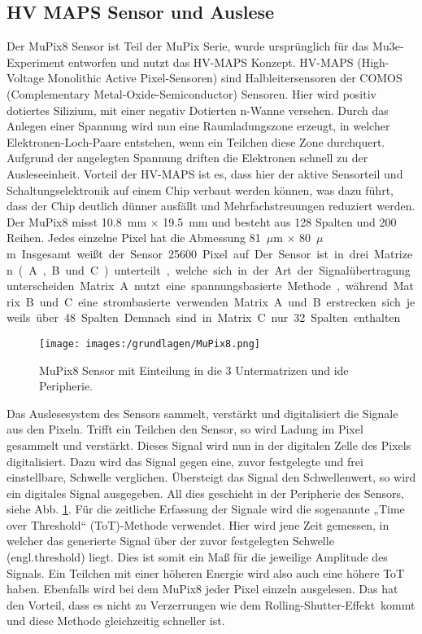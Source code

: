 \subsection{HV MAPS Sensor und Auslese}

Der MuPix8 Sensor ist Teil der MuPix Serie, wurde ursprünglich für das Mu3e-Experiment entworfen und nutzt das HV-MAPS Konzept.
HV-MAPS (High-Voltage Monolithic Active Pixel-Sensoren) sind Halbleitersensoren der COMOS (Complementary Metal-Oxide-Semiconductor) Sensoren. 
Hier wird positiv dotiertes Silizium, mit einer negativ Dotierten n-Wanne versehen. 
Durch das Anlegen einer Spannung wird nun eine Raumladungszone erzeugt, in welcher Elektronen-Loch-Paare entstehen, wenn ein Teilchen diese Zone durchquert.
Aufgrund der angelegten Spannung driften die Elektronen schnell zu der Ausleseeinheit. 
Vorteil der HV-MAPS ist es, dass hier der aktive Sensorteil und Schaltungselektronik auf einem Chip verbaut werden können, was dazu führt, dass der Chip deutlich dünner ausfällt und Mehrfachstreuungen reduziert werden. \\
\newline
Der MuPix8 misst \SI{10,8}{mm} $\times$ \SI{19,5}{mm} und besteht aus 128 Spalten und 200 Reihen. 
Jedes einzelne Pixel hat die Abmessung \SI{81}{$\mu$m} $\times$ \SI{80}{$\mu$m}.
Insgesamt weißt der Sensor 25600 Pixel auf.
Der Sensor ist in  drei Matrizen (A,B und C) unterteilt, welche sich in der Art der Signalübertragung unterscheiden. 
Matrix A nutzt eine spannungsbasierte Methode, während Matrix B und C eine strombasierte verwenden. 
Matrix A und B erstrecken sich jeweils über 48 Spalten.
Demnach sind in Matrix C nur 32 Spalten enthalten. \\

\begin{figure}[H]
    \centering
    \texttt{[image: images:/grundlagen/MuPix8.png]}
    \caption{ MuPix8 Sensor mit Einteilung in die 3 Untermatrizen und ide Peripherie.  \cite{Augustin2019}}
    \label{fig:MuPix}
\end{figure}

Das Auslesesystem des Sensors sammelt, verstärkt und digitalisiert die Signale aus den Pixeln. 
Trifft ein Teilchen den Sensor, so wird Ladung im Pixel gesammelt und verstärkt. 
Dieses Signal wird nun in der digitalen Zelle des Pixels digitalisiert.
Dazu wird das Signal gegen eine, zuvor festgelegte und frei einstellbare, Schwelle verglichen. 
Übersteigt das Signal den Schwellenwert, so wird ein digitales Signal ausgegeben. 
All dies geschieht in der Peripherie des Sensors, siehe Abb. \ref{fig:MuPix}.
Für die zeitliche Erfassung der Signale wird die sogenannte  „Time over Threshold“ (ToT)-Methode verwendet.
Hier wird jene Zeit gemessen, in welcher das generierte Signal über der zuvor festgelegten Schwelle (engl.threshold) liegt. 
Dies ist somit ein Maß für die jeweilige Amplitude des Signals. 
Ein Teilchen mit einer höheren Energie wird also auch eine höhere ToT haben. 
Ebenfalls wird bei dem MuPix8 jeder Pixel einzeln ausgelesen.
Das hat den Vorteil, dass es nicht zu Verzerrungen wie dem \glqq Rolling-Shutter-Effekt\grqq \ kommt und diese Methode gleichzeitig schneller ist. 